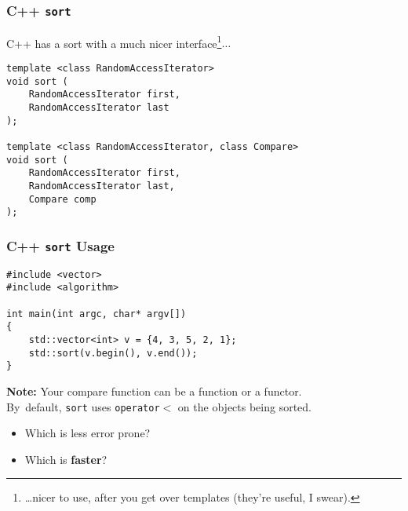\begin{frame}[fragile]
  \frametitle{C++ {\tt sort}}

  
  C++ has a sort with a much nicer interface\footnote{\ldots nicer to use, after you get over templates (they're useful, I swear).}$\ldots$

  \begin{lstlisting}
template <class RandomAccessIterator>
void sort (
    RandomAccessIterator first,
    RandomAccessIterator last
);

template <class RandomAccessIterator, class Compare>
void sort (
    RandomAccessIterator first,
    RandomAccessIterator last,
    Compare comp
);
  \end{lstlisting}
  
\end{frame}


\begin{frame}[fragile]
  \frametitle{C++ {\tt sort} Usage}

  
  \begin{lstlisting}
#include <vector>
#include <algorithm>

int main(int argc, char* argv[])
{
    std::vector<int> v = {4, 3, 5, 2, 1};
    std::sort(v.begin(), v.end());
}
  \end{lstlisting}
  \vfill

  {\bf Note:} Your compare function can be a function or a functor. \\By~default,
  {\tt sort} uses {\tt operator$<$} on the objects being sorted.

  \begin{itemize}
    \item Which is less error prone?
    \item Which is {\bf faster}?
  \end{itemize}
  
\end{frame}

